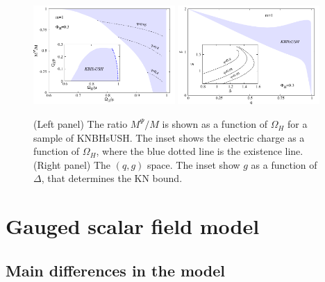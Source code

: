 \begin{figure}[H]
  \begin{center}
    \includegraphics[width=0.48\textwidth]{papers/KerrNewman/Mpsi}
    \includegraphics[width=0.48\textwidth]{papers/KerrNewman/qg}
  \end{center}
  \caption{(Left panel) The ratio $M^\Psi/M$ is shown as a function of $\Omega_H$ for a sample of KNBHsUSH. The inset shows the electric charge as a function of $\Omega_H$, where the blue dotted line is the existence line. 
	(Right panel)  The $(q,g)$ space. The inset show $g$ as a function of $\Delta$, that determines the KN bound.
}
\label{fig:w-g} 
\end{figure}

 
 


\section{Gauged scalar field model}
\label{sec_mod_g}




\subsection{Main differences in the model}


